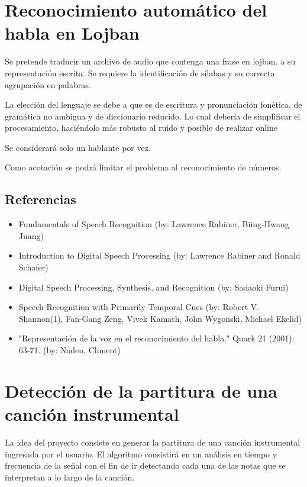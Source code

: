 \documentclass[a4paper,10pt]{article}
\begin{document}
\section*{Reconocimiento automático del habla en Lojban}
	Se pretende traducir un archivo de audio que contenga una
	frase en lojban, a su representación escrita.	Se requiere la
	identificación de sílabas y su correcta agrupación en palabras.

	La elección del lenguaje se debe a que es de escritura
	y pronunciación fonética, de gramática no ambigua y de
	diccionario reducido.  Lo cual debería de simplificar el
	procesamiento, haciéndolo más robusto al ruido y posible de
	realizar online

	Se considerará solo un hablante por vez.

	Como acotación se podrá limitar el problema al reconocimiento
	de números.

	\subsection*{Referencias}
		\begin{itemize}
			\item Fundamentals of Speech Recognition (by:
			Lawrence Rabiner, Biing-Hwang Juang)
			\item Introduction to Digital Speech Processing
			(by: Lawrence Rabiner and Ronald Schafer)
			\item Digital Speech Processing, Synthesis,
			and Recognition (by: Sadaoki Furui)
			\item Speech Recognition with Primarily Temporal
			Cues (by: Robert V. Shannon(1), Fan-Gang Zeng,
			Vivek Kamath, John Wygonski, Michael Ekelid)
			\item "Representación de la voz en el
			reconocimiento del habla." Quark 21 (2001):
			63-71. (by: Nadeu, Climent)
		\end{itemize}
	
	\clearpage

\section*{Detección de la partitura de una canción instrumental}
	La idea del proyecto consiste en generar la partitura de una
	canción instrumental ingresada por el usuario.  El algoritmo
	consistirá en un análisis en tiempo y frecuencia  de la
	señal con el fin de ir detectando cada una de las notas que se
	interpretan a lo largo de la canción.
\end{document}
